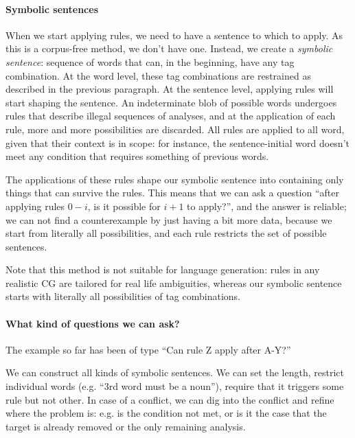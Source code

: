 
\paragraph{Symbolic sentences}

When we start applying rules, we need to have a sentence to which to apply.
As this is a corpus-free method, we don't have one.
Instead, we create a \emph{symbolic sentence}: sequence of words that can, in the beginning, have any tag combination.
At the word level, these tag combinations are restrained as described in the previous paragraph.
At the sentence level, applying rules will start shaping the sentence.
An indeterminate blob of possible words undergoes rules that describe illegal sequences of analyses,
and at the application of each rule, more and more possibilities are discarded.
All rules are applied to all word, given that their context is in scope: for instance, the sentence-initial word doesn't meet any condition that requires something of previous words.

The applications of these rules shape our symbolic sentence into containing only things that can survive the rules. This means that we can ask a question ``after applying rules $0-i$, is it possible for $i+1$ to apply?'', and the answer is reliable; we can not find a counterexample by just having a bit more data, because we start from literally all possibilities, and each rule
restricts the set of possible sentences.

Note that this method is not suitable for language generation: rules in any realistic CG are tailored for real life ambiguities, whereas our symbolic sentence starts with literally all possibilities of tag combinations.

\paragraph{What kind of questions we can ask?}

The example so far has been of type ``Can rule Z apply after A-Y?''

We can construct all kinds of symbolic sentences. We can set the length, restrict individual words (e.g. ``3rd word must be a noun''), require that it triggers some rule but not other.
In case of a conflict, we can dig into the conflict and refine where the problem is: e.g. is the condition not met, or is it the case that the target is already removed or the only remaining analysis.





